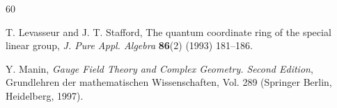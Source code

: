 \documentclass{amsart}
\theoremstyle{definition}
\theoremstyle{remark}
\numberwithin{equation}{section}
\begin{document}
\begin{thebibliography}{60}


 T. Levasseur and J. T. Stafford, The quantum coordinate ring of the special linear group, {\em J. Pure Appl. Algebra} {\bf 86}(2) (1993) 181--186.




 Y. Manin, {\em Gauge Field Theory and Complex Geometry. Second Edition}, Grundlehren der mathematischen Wissenschaften, Vol. 289 (Springer Berlin, Heidelberg, 1997).








\end{thebibliography}
\end{document}
